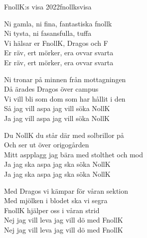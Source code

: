 \begin{song}{FnollK:s visa 2022}{fnollksvisa}
\begin{vers}
Ni gamla, ni fina, fantastiska fnollk\\
Ni tysta, ni fasansfulla, tuffa\\
Vi hälsar er FnollK, Dragos och F\\
Er räv, ert mörker, era ovvar svarta\\
Er räv, ert mörker, era ovvar svarta\\
\end{vers}

\begin{vers}
Ni tronar på minnen från mottagningen\\
Då ärades Dragos över campus\\
Vi vill bli som dom som har hållit i den\\
Så jag vill aspa jag vill söka NollK\\
Ja jag vill aspa jag vill söka NollK\\
\end{vers}

\begin{vers}
Du NollK du står där med solbrillor på\\
Och ser ut över origogården\\
Mitt aspplagg jag bära med stolthet och mod\\
Ja jag ska aspa jag ska söka NollK\\
Ja jag ska aspa jag ska söka NollK\\
\end{vers}

\begin{vers}
Med Dragos vi kämpar för våran sektion\\
Med mjölken i blodet ska vi segra\\
FnollK hjälper oss i våran strid\\
Nej jag vill leva jag vill dö med FnollK\\
Nej jag vill leva jag vill dö med FnollK\\
\end{vers}

\end{song}

